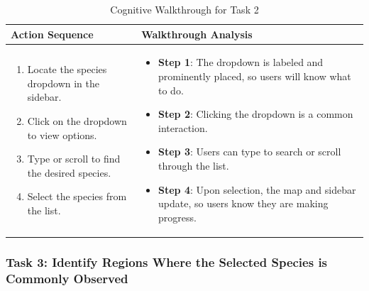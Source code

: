 \begin{table}[H]
    \centering
    \begin{tabular}{p{} | p{}}
        \hline
        \textbf{Action Sequence} & \textbf{Walkthrough Analysis} \\
        \hline
        \begin{enumerate}
            \item Locate the species dropdown in the sidebar.
            \item Click on the dropdown to view options.
            \item Type or scroll to find the desired species.
            \item Select the species from the list.
        \end{enumerate} &
        \begin{itemize}
            \item \textbf{Step 1}: The dropdown is labeled and prominently placed, so users will know what to do.
            \item \textbf{Step 2}: Clicking the dropdown is a common interaction.
            \item \textbf{Step 3}: Users can type to search or scroll through the list.
            \item \textbf{Step 4}: Upon selection, the map and sidebar update, so users know they are making progress.
        \end{itemize} \\
        \hline
    \end{tabular}
    \caption{Cognitive Walkthrough for Task 2}
    \label{tab:task2_walkthrough}
\end{table}

\subsubsection{Task 3: Identify Regions Where the Selected Species is Commonly Observed}

